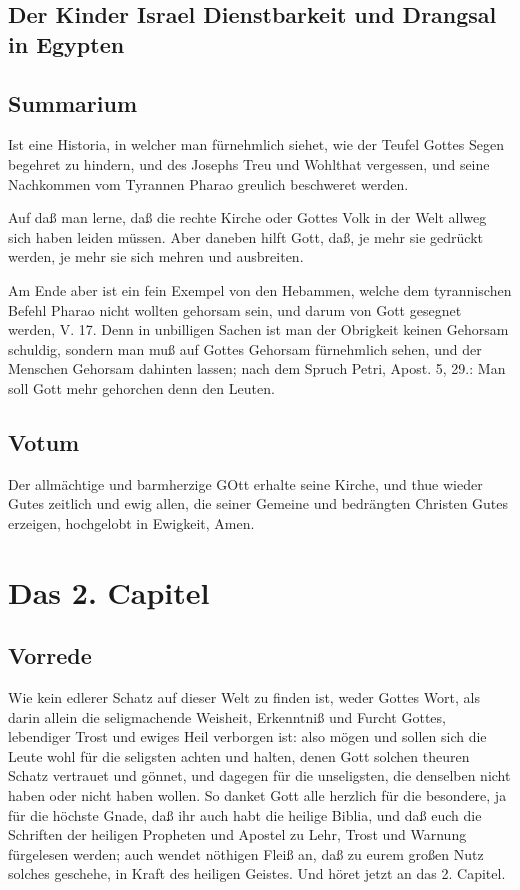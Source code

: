 \section{Der Kinder Israel Dienstbarkeit und Drangsal in Egypten}



\section{Summarium}

Ist eine Historia, in welcher man fürnehmlich siehet, wie der Teufel Gottes Segen begehret zu hindern, und des Josephs Treu und Wohlthat vergessen, und seine Nachkommen vom Tyrannen Pharao greulich beschweret werden.

Auf daß man lerne, daß die rechte Kirche oder Gottes Volk in der Welt allweg sich haben leiden müssen. Aber daneben hilft Gott, daß, je mehr sie gedrückt werden, je mehr sie sich mehren und ausbreiten.

Am Ende aber ist ein fein Exempel von den Hebammen, welche dem tyrannischen Befehl Pharao nicht wollten gehorsam sein, und darum von Gott gesegnet werden, V. 17. Denn in unbilligen Sachen ist man der Obrigkeit keinen Gehorsam schuldig, sondern man muß auf Gottes Gehorsam fürnehmlich sehen, und der Menschen Gehorsam dahinten lassen; nach dem Spruch Petri, Apost. 5, 29.: Man soll Gott mehr gehorchen denn den Leuten.

\section{Votum}

Der allmächtige und barmherzige GOtt erhalte seine Kirche, und thue wieder Gutes zeitlich und ewig allen, die seiner Gemeine und bedrängten Christen Gutes erzeigen, hochgelobt in Ewigkeit, Amen.

\chapter{Das 2. Capitel}

\section{Vorrede}

Wie kein edlerer Schatz auf dieser Welt zu finden ist, weder Gottes Wort, als darin allein die seligmachende Weisheit, Erkenntniß und Furcht Gottes, lebendiger Trost und ewiges Heil verborgen ist: also mögen und sollen sich die Leute wohl für die seligsten achten und halten, denen Gott solchen theuren Schatz vertrauet und gönnet, und dagegen für die unseligsten, die denselben nicht haben oder nicht haben wollen. So danket Gott alle herzlich für die besondere, ja für die höchste Gnade, daß ihr auch habt die heilige Biblia, und daß euch die Schriften der heiligen Propheten und Apostel zu Lehr, Trost und Warnung fürgelesen werden; auch wendet nöthigen Fleiß an, daß zu eurem großen Nutz solches geschehe, in Kraft des heiligen Geistes. Und höret jetzt an das 2. Capitel.

